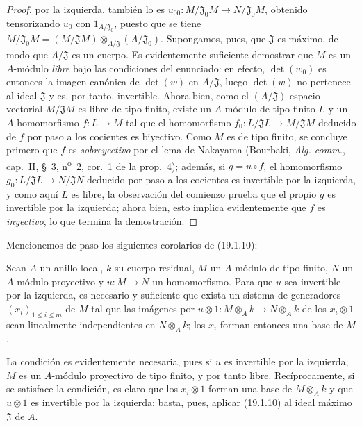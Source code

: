 \begin{proof}
por la izquierda, también lo es
$u_{00}:M/\mathfrak J_0M\to N/\mathfrak J_0M$, obtenido tensorizando $u_0$ con
$1_{A/\mathfrak J_0}$, puesto que se tiene
$M/\mathfrak J_0M=(M/\mathfrak JM)\otimes_{A/\mathfrak J}(A/\mathfrak J_0)$.
Supongamos, pues, que $\mathfrak J$ es máximo, de modo que $A/\mathfrak J$ es
un cuerpo. Es evidentemente suficiente demostrar que $M$ es un $A$-módulo
\emph{libre} bajo las condiciones del enunciado: en efecto, $\det(w_0)$ es
entonces la imagen canónica de $\det(w)$ en $A/\mathfrak J$, luego $\det(w)$
no pertenece al ideal $\mathfrak J$ y es, por tanto, invertible. Ahora bien,
como el $(A/\mathfrak J)$-espacio vectorial $M/\mathfrak JM$ es libre de tipo
finito, existe un $A$-módulo de tipo finito $L$ y un $A$-homomorfismo $f:L\to M$
tal que el homomorfismo $f_0:L/\mathfrak JL\to M/\mathfrak JM$ deducido de $f$
por paso a los cocientes es biyectivo. Como $M$ es de tipo finito, se concluye
primero que $f$ es \emph{sobreyectivo} por el lema de Nakayama (Bourbaki,
\emph{Alg. comm.}, cap.~II, §~3, n\textsuperscript{o}~2, cor.~1 de la
prop.~4); además, si $g=u\circ f$, el homomorfismo
$g_0:L/\mathfrak JL\to N/\mathfrak JN$ deducido por paso a los cocientes es
invertible por la izquierda, y como aquí $L$ es libre, la observación del
comienzo prueba que el propio $g$ es invertible por la izquierda; ahora bien,
esto implica evidentemente que $f$ es \emph{inyectivo}, lo que termina la demostración.
\end{proof}

Mencionemos de paso los siguientes corolarios de (19.1.10):

\begin{corollary}[19.1.11]
\label{0.19.1.11-fr}
Sean $A$ un anillo local, $k$ su cuerpo residual, $M$ un $A$-módulo de tipo
finito, $N$ un $A$-módulo proyectivo y $u:M\to N$ un homomorfismo. Para que
$u$ sea invertible por la izquierda, es necesario y suficiente que exista un
sistema de generadores $(x_i)_{1\leq i\leq m}$ de $M$ tal que las imágenes por
$u\otimes 1:M\otimes_Ak\to N\otimes_Ak$ de los $x_i\otimes1$ sean linealmente
independientes en $N\otimes_Ak$; los $x_i$ forman entonces una base de $M$.
\end{corollary}

La condición es evidentemente necesaria, pues si $u$ es invertible por la
izquierda, $M$ es un $A$-módulo proyectivo de tipo finito, y por tanto libre.
Recíprocamente, si se satisface la condición, es claro que los $x_i\otimes1$
forman una base de $M\otimes_Ak$ y que $u\otimes1$ es invertible por la
izquierda; basta, pues, aplicar (19.1.10) al ideal máximo $\mathfrak J$ de $A$.

